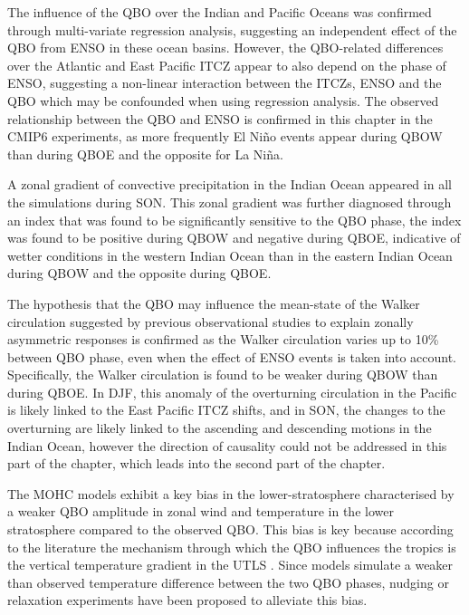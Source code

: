 The influence of the QBO over the Indian and Pacific Oceans was confirmed through multi-variate regression analysis, suggesting an independent effect of the QBO from ENSO in these ocean basins. 
However, the QBO-related differences over the Atlantic and East Pacific ITCZ appear to also depend on the phase of ENSO, suggesting a non-linear interaction between the ITCZs, ENSO and the QBO which may be confounded when using regression analysis.  
 The observed relationship between the QBO and ENSO is confirmed in this chapter in the CMIP6 experiments, as more frequently El Niño events appear during QBOW than during QBOE and the opposite for La Niña. 
 
 A zonal gradient of convective precipitation in the Indian Ocean appeared in all the simulations during SON. 
 This zonal gradient was further diagnosed through an index that was found to be significantly sensitive to the QBO  phase, the index was found to be positive during QBOW and negative during QBOE, indicative of wetter conditions in the western Indian Ocean than in the eastern  Indian Ocean during QBOW and the opposite during QBOE. 
 
 The hypothesis that the QBO may influence the mean-state of the Walker circulation suggested by previous observational studies to explain zonally asymmetric responses \citep[e.g.][]{collimore2003,liess2012} is confirmed as the Walker circulation varies up to 10\% between QBO phase, even when the effect of ENSO events is taken into account. 
 Specifically, the Walker circulation is found to be weaker during QBOW than during QBOE. In DJF, this anomaly of the overturning circulation in the Pacific is likely linked to the East Pacific ITCZ shifts, and in SON, the changes to the overturning are likely linked to the ascending and descending motions in the Indian Ocean, however the direction of causality could not be addressed in this part of the chapter, which leads into the second part of the chapter.
 

The MOHC models exhibit a key bias in the lower-stratosphere characterised by a weaker QBO amplitude in zonal wind and temperature in the lower stratosphere compared to the observed QBO. This bias is key because according to the literature the mechanism through which the QBO influences the tropics is the vertical temperature gradient in the UTLS \citep{liess2012,nie2015,lee2018}. Since models simulate a weaker than observed temperature difference between the two QBO phases, nudging or relaxation experiments have been proposed \citep{lee2018} to alleviate this bias. 

